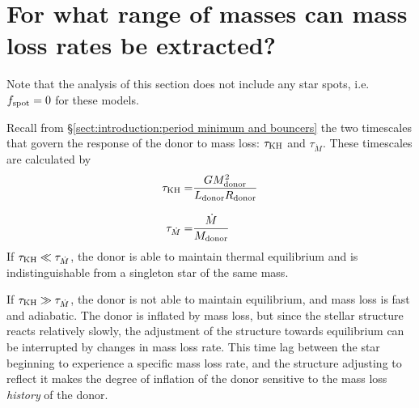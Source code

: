\newpage
\section{For what range of masses can mass loss rates be extracted?}
\label{sect:results:MESA massloss allowable mass range}

Note that the analysis of this section does not include any star spots, i.e. $f_{\rm spot} = 0$ for these models.

Recall from \S\ref{sect:introduction:period minimum and bouncers} the two timescales that govern the response of the donor to mass loss: $\tau_{\rm KH}$ and $\tau_{\dot M}$. These timescales are calculated by
\begin{align}
    \tau_{\rm KH} =& \frac{G M_{\rm donor}^2}{L_{\rm donor} R_{\rm donor}} \\[8pt]
    \tau_{\dot M} =& \frac{\dot M}{M_{\rm donor}}
\end{align}
If $\tau_{\rm KH} \ll \tau_{\dot M}$, the donor is able to maintain thermal equilibrium and is indistinguishable from a singleton star of the same mass.

If $\tau_{\rm KH} \gg \tau_{\dot M}$, the donor is not able to maintain equilibrium, and mass loss is fast and adiabatic.
The donor is inflated by mass loss, but since the stellar structure reacts relatively slowly, the adjustment of the structure towards equilibrium can be interrupted by changes in mass loss rate. This time lag between the star beginning to experience a specific mass loss rate, and the structure adjusting to reflect it makes the degree of inflation of the donor sensitive to the mass loss \textit{history} of the donor.

